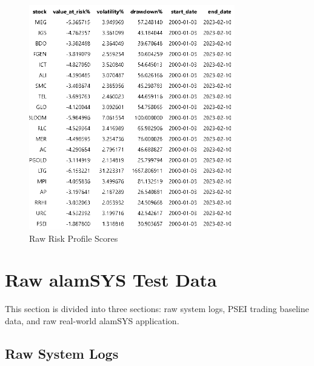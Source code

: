 \begin{figure}[ht]
    \centering
    \includegraphics[width=0.80\textwidth]{./assets/Appendices/B/Distribution_DailyReturns/Raw_RiskTable.png}
    \caption{Raw Risk Profile Scores}
    \label{fig:rawrisktable}
\end{figure}
\FloatBarrier


\section{Raw alamSYS Test Data}
\label{sec:rawalamSYS}
This section is divided into three sections: raw system logs, PSEI trading baseline data, 
and raw real-world alamSYS application.

\subsection{Raw System Logs}
\label{subsec:rawsyslogs}

